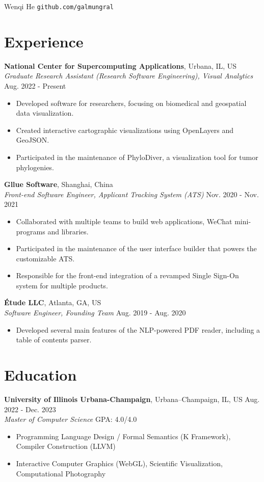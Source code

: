 \documentclass[12pt]{article}
\begin{document}
{\Huge Wenqi He} \quad \texttt{github.com/galmungral}

\section*{Experience}

\textbf{National Center for Supercomputing Applications}, Urbana, IL, US\\
\textit{Graduate Research Assistant (Research Software Engineering), Visual Analytics} \hfill Aug. 2022 - Present
\begin{itemize}
\item Developed software for researchers, focusing on biomedical and geospatial data visualization.
\item Created interactive cartographic visualizations using OpenLayers and GeoJSON.
\item Participated in the maintenance of PhyloDiver, a visualization tool for tumor phylogenies.
\end{itemize}

\textbf{Gllue Software}, Shanghai, China\\
\textit{Front-end Software Engineer, Applicant Tracking System (ATS)} \hfill Nov. 2020 - Nov. 2021
\begin{itemize}
\item Collaborated with multiple teams to build web applications, WeChat mini-programs and libraries.
\item Participated in the maintenance of the user interface builder that powers the customizable ATS.
\item Responsible for the front-end integration of a revamped Single Sign-On system for multiple products.
\end{itemize}

\textbf{Étude LLC}, Atlanta, GA, US\\
\textit{Software Engineer, Founding Team} \hfill Aug. 2019 - Aug. 2020
\begin{itemize}
\item Developed several main features of the NLP-powered PDF reader, including a table of contents parser.
\end{itemize}

\section*{Education}
\textbf{University of Illinois Urbana-Champaign}, Urbana–Champaign, IL, US \hfill Aug. 2022 - Dec. 2023 \\
\textit{Master of Computer Science}  \hfill GPA: 4.0/4.0 
\begin{itemize}
\small
\item Programming Language Design / Formal Semantics (K Framework), Compiler Construction (LLVM)
\item Interactive Computer Graphics (WebGL), Scientific Visualization, Computational Photography
\end{itemize}
\end{document}
